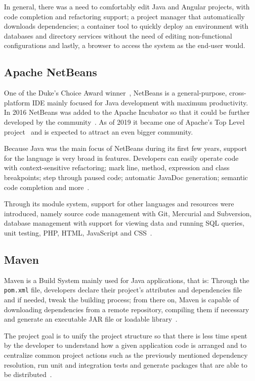 In general, there was a need to comfortably edit Java and Angular projects, with code completion and refactoring support; a project manager that automatically downloads dependencies; a container tool to quickly deploy an environment with databases and directory services without the need of editing non-functional configurations and lastly, a browser to access the system as the end-user would.

\subsection{Apache NetBeans}\label{netbeans}
One of the Duke's Choice Award winner~\cite{dukechoice}, NetBeans is a general-purpose, cross-platform \gls{IDE} mainly focused for Java development with maximum productivity. In 2016 NetBeans was added to the Apache Incubator so that it could be further developed by the community~\cite{incubation}. As of 2019 it became one of Apache's Top Level project~\cite{graduation} and is expected to attract an even bigger community.

Because Java was the main focus of NetBeans during its first few years, support for the language is very broad in features. Developers can easily operate code with context-sensitive refactoring; mark line, method, expression and class breakpoints; step through paused code; automatic JavaDoc generation; semantic code completion and more~\cite{nbassistance}.

Through its module system, support for other languages and resources were introduced, namely source code management with Git, Mercurial and Subversion, database management with support for viewing data and running \gls{SQL} queries, unit testing, PHP, HTML, JavaScript and CSS~\cite{nettutorials}.

\subsection{Maven}
Maven is a Build System mainly used for Java applications, that is: Through the \texttt{pom.xml} file, developers declare their project's attributes and dependencies file and if needed, tweak the building process; from there on, Maven is capable of downloading dependencies from a remote repository, compiling them if necessary and generate an executable \gls{JAR} file or loadable library~\cite{maven}.

The project goal is to unify the project structure so that there is less time spent by the developer to understand how a given application code is arranged and to centralize common project actions such as the previously mentioned dependency resolution, run unit and integration tests and generate packages that are able to be distributed~\cite{mavenintro}.

